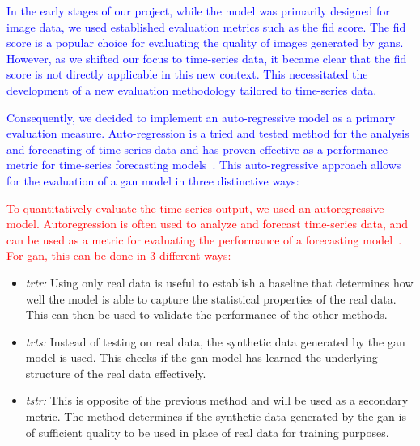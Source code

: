 \textcolor{blue}{In the early stages of our project, while the model was primarily designed for image data, we used established evaluation metrics such as the \gls*{fid} score. The \gls{fid} score is a popular choice for evaluating the quality of images generated by \glspl*{gan}. However, as we shifted our focus to time-series data, it became clear that the \gls{fid} score is not directly applicable in this new context. This necessitated the development of a new evaluation methodology tailored to time-series data.}

\textcolor{blue}{Consequently, we decided to implement an auto-regressive model as a primary evaluation measure. Auto-regression is a tried and tested method for the analysis and forecasting of time-series data and has proven effective as a performance metric for time-series forecasting models~\cite{rnntimeseries}. This auto-regressive approach allows for the evaluation of a \gls*{gan} model in three distinctive ways: \cite{esteban2017realvalued}}

\textcolor{red}{To quantitatively evaluate the time-series output, we used an autoregressive model. Autoregression is often used to analyze and forecast time-series data, and can be used as a metric for evaluating the performance of a forecasting model~\cite{rnntimeseries}. For \gls*{gan}, this can be done in 3 different ways:} %
\begin{itemize}
    \item \textit{\gls*{trtr}:} Using only real data is useful to establish a baseline that determines how well the model is able to capture the statistical properties of the real data. This can then be used to validate the performance of the other methods.
    \item \textit{\gls*{trts}:} Instead of testing on real data, the synthetic data generated by the 
    \gls*{gan} model is used. This checks if the \gls*{gan} model has learned the underlying structure of the real data effectively.
    \item \textit{\gls*{tstr}:} This is opposite of the previous method and will be used as a secondary metric. The method determines if the synthetic data generated by the \gls*{gan} is of sufficient quality to be used in place of real data for training purposes.
\end{itemize}



%
